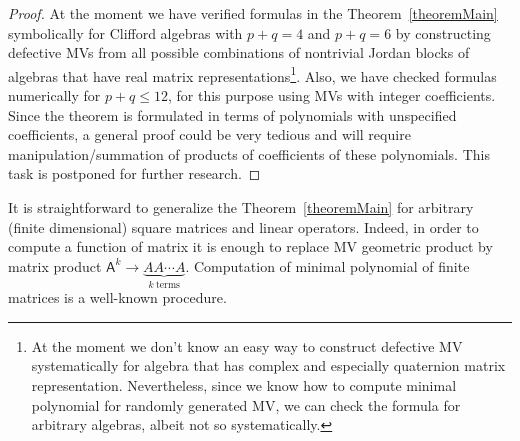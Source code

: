 \documentclass[AMA,STIX1COL]{WileyNJD-v2}
\def\m#1{\mathsf{#1}} %
\def\m#1{\mathsf{#1}}%
\begin{document}
\begin{proof}
At the moment we have verified formulas in the Theorem~\ref{theoremMain} symbolically for Clifford algebras with $p+q=4$ and
  $p+q=6$ by constructing defective MVs from all possible combinations of nontrivial Jordan blocks of algebras that have real matrix representations\footnote{At the moment we don't know an easy way to construct defective MV systematically for algebra that has complex and especially quaternion matrix representation. Nevertheless, since we know how to compute minimal polynomial for randomly generated MV, we can check the formula for arbitrary algebras, albeit not so systematically.}.  Also, we have checked formulas numerically  for $p+q\le 12$, for this purpose using MVs with integer
  coefficients. Since the theorem is formulated in terms of polynomials with unspecified coefficients,
  a general proof could be very tedious and will require manipulation/summation of products of coefficients of these polynomials.
  This task is postponed for further research.
\end{proof}

\begin{remark}[Generalization]
  It is straightforward to generalize the Theorem~\ref{theoremMain}  for arbitrary (finite dimensional)
  square matrices and linear operators. Indeed, in order to compute a function of matrix it is enough to replace
  MV geometric product by matrix product $\m{A}^k\to \underbrace{A A\cdots A}_{k~\text{terms}}$.
  Computation of minimal polynomial of finite matrices is a well-known procedure.
\end{remark}
\end{document}
